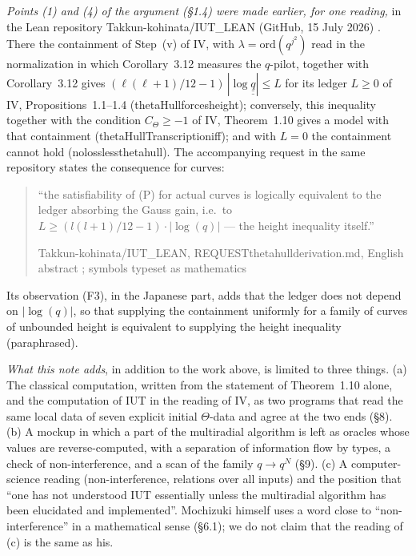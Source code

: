 \documentclass[11pt,a4paper]{article}
\newcommand{\qq}{\underline{\underline{q}}}
\newcommand{\leanus}{\textunderscore\allowbreak}
\newcommand{\lean}[1]{{\ttfamily\let\_\leanus #1}}
\newcommand{\lab}[2]{{\upshape\fcolorbox{#1}{#1!8}{\scriptsize\sffamily\bfseries\textcolor{#1}{#2}}}}
\newcommand{\tagX}{\lab{Purple}{X}}
\newcommand{\tagH}{\lab{BurntOrange}{H}}
\newcommand{\q}[1]{``#1''}
\newcommand{\srcquote}[2]{\begin{quote}\small #1\par\nopagebreak\hfill{\footnotesize #2}\end{quote}}
\begin{document}
\tagX{} \emph{Points (1) and (4) of the argument (\S1.4) were made earlier, for one reading,} in the Lean
repository Takkun-kohinata/IUT\_LEAN (GitHub, 15 July 2026) \cite{TK}. There the containment of Step~(v) of IV, with
$\lambda=\mathrm{ord}(q^{j^2})$ read in the normalization in which Corollary~3.12 measures the $q$-pilot, together with
Corollary~3.12 gives $(\ell(\ell+1)/12-1)\,|\log\qq|\le L$ for its ledger $L\ge0$ of IV, Propositions~1.1--1.4
(\lean{thetaHull\_forces\_height}); conversely, this inequality together with the condition $C_\Theta\ge-1$ of IV,
Theorem~1.10 gives a model with that containment (\lean{thetaHullTranscription\_iff}); and with $L=0$ the containment
cannot hold (\lean{no\_lossless\_theta\_hull}). The accompanying request in the same repository states the consequence
for curves:
\srcquote{\q{the satisfiability of (P) for actual curves is logically equivalent to the ledger absorbing the Gauss
gain, i.e.\ to $L\ge(l(l+1)/12-1)\cdot|\log(q)|$ --- the height inequality itself.}}{Takkun-kohinata/IUT\_LEAN,
\lean{REQUEST\_theta\_hull\_derivation.md}, English abstract \cite{TK}; symbols typeset as mathematics}
Its observation (F3), in the Japanese part, adds that the ledger does not depend on $|\log(q)|$, so that supplying the
containment uniformly for a family of curves of unbounded height is equivalent to supplying the height inequality
(paraphrased).

\tagH{} \emph{What this note adds}, in addition to the work above, is limited to three things. (a) The classical
computation, written from the statement of Theorem~1.10 alone, and the computation of IUT in the reading of IV, as two
programs that read the same local data of seven explicit initial $\Theta$-data and agree at the two ends (\S8). (b) A
mockup in which a part of the multiradial algorithm is left as oracles whose values are reverse-computed, with a
separation of information flow by types, a check of non-interference, and a scan of the family $q\to q^N$ (\S9). (c) A
computer-science reading (non-interference, relations over all inputs) and the position that ``one has not understood
IUT essentially unless the multiradial algorithm has been elucidated and implemented''. Mochizuki himself uses a word
close to ``non-interference'' in a mathematical sense (\S6.1); we do not claim that the reading of (c) is the same as
his.
\end{document}
